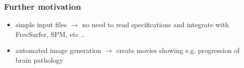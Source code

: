\documentclass[10pt,xcolor=table,aspectratio=169]{beamer}
\begin{document}
\begin{frame}
 \frametitle{Further motivation}

 
\newcommand{\speed}{4} 
\newcommand{\animOne}{
\begin{animateinline}[autoplay,loop]{\speed}  
   \multiframe{24}{i=1+1}{%
  \centering
   \texttt{[image: images/sara\_video/outer-\\i.png]}
  }
\end{animateinline}
}
 
\begin{itemize}
 \item simple input files $\rightarrow$ no need to read specifications and integrate with FreeSurfer, SPM, etc ..
 \item automated image generation $\rightarrow$ create movies showing e.g. progression of brain pathology

 
\begin{figure}


\end{figure}
\end{itemize}
\end{frame}
\end{document}
